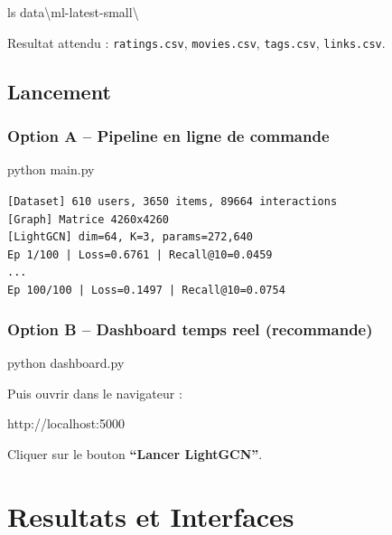 \documentclass[12pt,a4paper]{report}
\begin{document}
\begin{cmdbox}[-- Verification]
ls data\textbackslash ml-latest-small\textbackslash
\end{cmdbox}

Resultat attendu : \texttt{ratings.csv}, \texttt{movies.csv},
\texttt{tags.csv}, \texttt{links.csv}.

\section{Lancement}

\subsection{Option A -- Pipeline en ligne de commande}

\begin{cmdbox}
python main.py
\end{cmdbox}

\begin{resultbox}
\texttt{[Dataset] 610 users, 3650 items, 89664 interactions}\\
\texttt{[Graph] Matrice 4260x4260}\\
\texttt{[LightGCN] dim=64, K=3, params=272,640}\\
\texttt{Ep 1/100 | Loss=0.6761 | Recall@10=0.0459}\\
\texttt{...}\\
\texttt{Ep 100/100 | Loss=0.1497 | Recall@10=0.0754}
\end{resultbox}

\subsection{Option B -- Dashboard temps reel (recommande)}

\begin{cmdbox}
python dashboard.py
\end{cmdbox}

Puis ouvrir dans le navigateur :

\begin{cmdbox}
http://localhost:5000
\end{cmdbox}

Cliquer sur le bouton \textbf{``Lancer LightGCN''}.

\chapter{Resultats et Interfaces}
\end{document}
